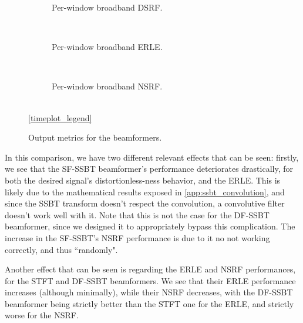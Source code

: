 \begin{figure}[!t]
	\centering
	\begin{subfigure}{\textwidth}
		\centering
		
		\caption{Per-window broadband DSRF.}
		\label{subfig:lineplot_dsrf_32_n15_acc_v7_Ly_avg}
	\end{subfigure}\\[1em]
	\begin{subfigure}{\textwidth}
		\centering
		
		\caption{Per-window broadband ERLE.}
		\label{subfig:lineplot_erle_32_n15_acc_v7_Ly_avg}
	\end{subfigure}\\[1em]
	\begin{subfigure}{\textwidth}
		\centering
		
		\caption{Per-window broadband NSRF.}
		\label{subfig:lineplot_nsrf_32_n15_acc_v7_Ly_avg}
	\end{subfigure}\\[1em]
	\ref*{timeplot_legend}
	\caption{Output metrics for the beamformers.}
	\label{fig:lineplots_32_n15_acc_v7_Ly_avg}
\end{figure}

In this comparison, we have two different relevant effects that can be seen: firstly, we see that the SF-SSBT beamformer's performance deteriorates drastically, for both the desired signal's distortionless-ness behavior, and the ERLE. This is likely due to the mathematical results exposed in \cref{app:ssbt_convolution}, and since the SSBT transform doesn't respect the convolution, a convolutive filter doesn't work well with it. Note that this is not the case for the DF-SSBT beamformer, since we designed it to appropriately bypass this complication. The increase in the SF-SSBT's NSRF performance is due to it no not working correctly, and thus ``randomly".

Another effect that can be seen is regarding the ERLE and NSRF performances, for the STFT and DF-SSBT beamformers. We see that their ERLE performance increases (although minimally), while their NSRF decreases, with the DF-SSBT beamformer being strictly better than the STFT one for the ERLE, and strictly worse for the NSRF.